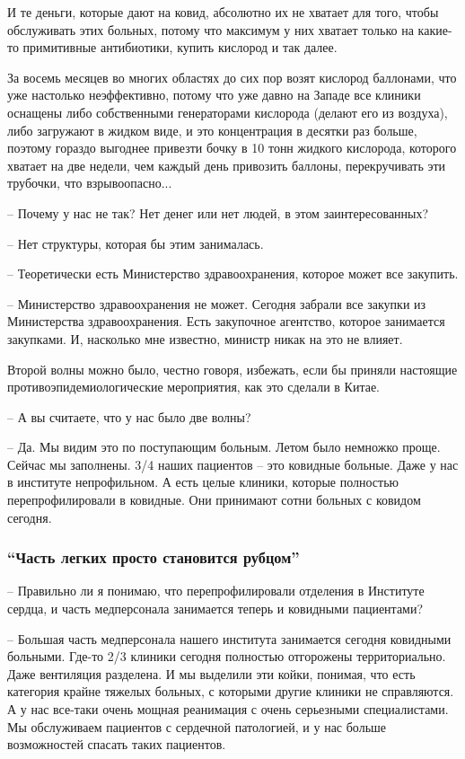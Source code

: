 И те деньги, которые дают на ковид, абсолютно их не хватает для того, чтобы
обслуживать этих больных, потому что максимум у них хватает только на какие-то
примитивные антибиотики, купить кислород и так далее.

За восемь месяцев во многих областях до сих пор возят кислород баллонами, что
уже настолько неэффективно, потому что уже давно на Западе все клиники оснащены
либо собственными генераторами кислорода (делают его из воздуха), либо
загружают в жидком виде, и это концентрация в десятки раз больше, поэтому
гораздо выгоднее привезти бочку в 10 тонн жидкого кислорода, которого хватает
на две недели, чем каждый день привозить баллоны, перекручивать эти трубочки,
что взрывоопасно...

– Почему у нас не так? Нет денег или нет людей, в этом заинтересованных?

– Нет структуры, которая бы этим занималась. 

– Теоретически есть Министерство здравоохранения, которое может все закупить.

– Министерство здравоохранения не может. Сегодня забрали все закупки из
Министерства здравоохранения. Есть закупочное агентство, которое занимается
закупками. И, насколько мне известно, министр никак на это не влияет.

Второй волны можно было, честно говоря, избежать, если бы приняли настоящие
противоэпидемиологические мероприятия, как это сделали в Китае. 

– А вы считаете, что у нас было две волны?

– Да. Мы видим это по поступающим больным. Летом было немножко проще. Сейчас мы
заполнены. 3/4 наших пациентов – это ковидные больные. Даже у нас в институте
непрофильном. А есть целые клиники, которые полностью перепрофилировали в
ковидные. Они принимают сотни больных с ковидом сегодня. 

\subsubsection{\enquote{Часть легких просто становится рубцом}}

– Правильно ли я понимаю, что перепрофилировали отделения в Институте сердца, и
часть медперсонала занимается теперь и ковидными пациентами?

– Большая часть медперсонала нашего института занимается сегодня ковидными
больными. Где-то 2/3 клиники сегодня полностью отгорожены территориально. Даже
вентиляция разделена. И мы выделили эти койки, понимая, что есть категория
крайне тяжелых больных, с которыми другие клиники не справляются. А у нас
все-таки очень мощная реанимация с очень серьезными специалистами. Мы
обслуживаем пациентов с сердечной патологией, и у нас больше возможностей
спасать таких пациентов. 


